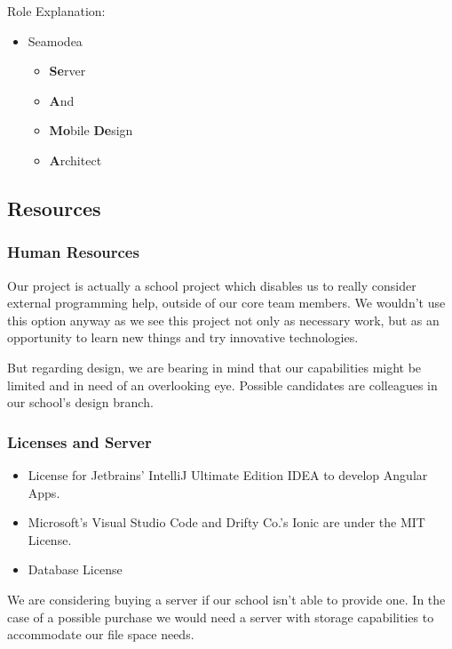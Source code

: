 \documentclass[12pt]{article}
\theoremstyle{definition}
\newenvironment{text}{
}{}
\begin{document}
Role Explanation:
\begin{itemize}
    \item Seamodea
    \begin{itemize}
        \item \textbf{Se}rver
        \item \textbf{A}nd
        \item \textbf{Mo}bile \textbf{De}sign
        \item \textbf{A}rchitect
    \end{itemize} 
\end{itemize}
\subsection{Resources}
\subsubsection{Human Resources}
\begin{text}
Our project is actually a school project which disables us to really consider external programming help, outside of our core team members. We wouldn't use this option anyway as we see this project not only as necessary work, but as an opportunity to learn new things and try innovative technologies.

But regarding design, we are bearing in mind that our capabilities might be limited and in need of an overlooking eye. Possible candidates are colleagues in our school's design branch.\end{text}

\subsubsection{Licenses and Server}
\begin{itemize}
\item License for Jetbrains' IntelliJ Ultimate Edition IDEA to develop Angular Apps.
\item Microsoft's Visual Studio Code and Drifty Co.'s Ionic are under the MIT License.
\item Database License
\end{itemize}

We are considering buying a server if our school isn't able to provide one. In the case of a possible purchase we would need a server with storage capabilities to accommodate our file space needs.
\end{document}

